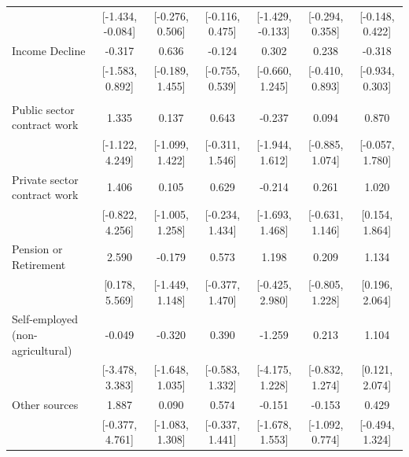 \documentclass[
  10,
  letterpaper,
  DIV=11,
  numbers=noendperiod]{scrartcl}
\begin{document}
\begin{table}
\begin{tabular}[t]{lcccccc}
\hspace{1em} & {}[-1.434, -0.084] & {}[-0.276, 0.506] & {}[-0.116, 0.475] & {}[-1.429, -0.133] & {}[-0.294, 0.358] & {}[-0.148, 0.422]\\
\hspace{1em}Income Decline & -0.317 & 0.636 & -0.124 & 0.302 & 0.238 & -0.318\\
\hspace{1em} & {}[-1.583, 0.892] & {}[-0.189, 1.455] & {}[-0.755, 0.539] & {}[-0.660, 1.245] & {}[-0.410, 0.893] & {}[-0.934, 0.303]\\
\addlinespace[0.3em]
\multicolumn{7}{l}{\cellcolor[HTML]{3498DB}{\textbf{Income Source}}}\\
\hspace{1em}Public sector contract work & 1.335 & 0.137 & 0.643 & -0.237 & 0.094 & 0.870\\
\hspace{1em} & {}[-1.122, 4.249] & {}[-1.099, 1.422] & {}[-0.311, 1.546] & {}[-1.944, 1.612] & {}[-0.885, 1.074] & {}[-0.057, 1.780]\\
\hspace{1em}Private sector contract work & 1.406 & 0.105 & 0.629 & -0.214 & 0.261 & 1.020\\
\hspace{1em} & {}[-0.822, 4.256] & {}[-1.005, 1.258] & {}[-0.234, 1.434] & {}[-1.693, 1.468] & {}[-0.631, 1.146] & {}[0.154, 1.864]\\
\hspace{1em}Pension or Retirement & 2.590 & -0.179 & 0.573 & 1.198 & 0.209 & 1.134\\
\hspace{1em} & {}[0.178, 5.569] & {}[-1.449, 1.148] & {}[-0.377, 1.470] & {}[-0.425, 2.980] & {}[-0.805, 1.228] & {}[0.196, 2.064]\\
\hspace{1em}Self-employed (non-agricultural) & -0.049 & -0.320 & 0.390 & -1.259 & 0.213 & 1.104\\
\hspace{1em} & {}[-3.478, 3.383] & {}[-1.648, 1.035] & {}[-0.583, 1.332] & {}[-4.175, 1.228] & {}[-0.832, 1.274] & {}[0.121, 2.074]\\
\hspace{1em}Other sources & 1.887 & 0.090 & 0.574 & -0.151 & -0.153 & 0.429\\
\hspace{1em} & {}[-0.377, 4.761] & {}[-1.083, 1.308] & {}[-0.337, 1.441] & {}[-1.678, 1.553] & {}[-1.092, 0.774] & {}[-0.494, 1.324]\\

\end{tabular}
\end{table}
\end{document}
